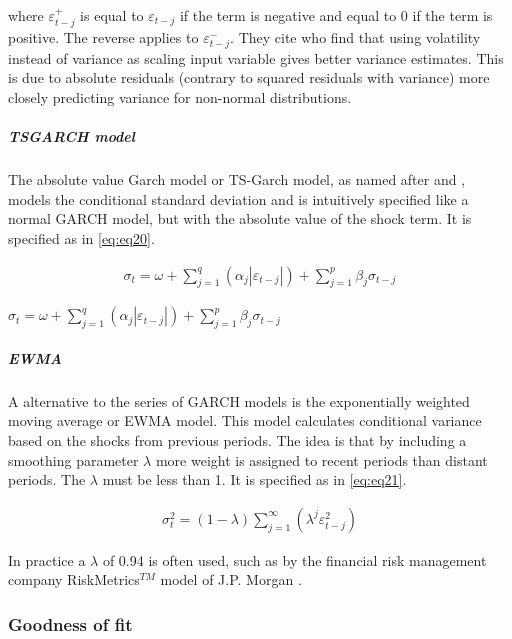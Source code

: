 \documentclass[a4paper, twoside]{templates/ociamthesis}
\begin{document}
\noindent where \(\varepsilon_{t-j}^+\) is equal to \(\varepsilon_{t-j}\) if the term is negative and equal to 0 if the term is positive. The reverse applies to \(\varepsilon_{t-j}^-\). They cite \textcite{davidian1987} who find that using volatility instead of variance as scaling input variable gives better variance estimates. This is due to absolute residuals (contrary to squared residuals with variance) more closely predicting variance for non-normal distributions.

\hypertarget{tsgarch-model}{%
\subparagraph{TSGARCH model}\label{tsgarch-model}}

\noindent The absolute value Garch model or TS-Garch model, as named after \textcite{taylor1986} and \textcite{schwert1989}, models the conditional standard deviation and is intuitively specified like a normal GARCH model, but with the absolute value of the shock term. It is specified as in \eqref{eq:eq20}.

\begin{align}
\sigma_t = \omega + \sum\limits_{j=1}^q (\alpha_j \left|\varepsilon_{t-j}\right|) +
\sum\limits_{j = 1}^p \beta_j \sigma_{t-j}
 \label{eq:eq20}
\end{align}

\newpage

\(\sigma_t = \omega + \sum\limits_{j=1}^q (\alpha_j \left|\varepsilon_{t-j}\right|) +\sum\limits_{j = 1}^p \beta_j \sigma_{t-j}\)

\hypertarget{ewma}{%
\subparagraph{EWMA}\label{ewma}}

\noindent A alternative to the series of GARCH models is the exponentially weighted moving average or EWMA model. This model calculates conditional variance based on the shocks from previous periods. The idea is that by including a smoothing parameter \(\lambda\) more weight is assigned to recent periods than distant periods. The \(\lambda\) must be less than 1. It is specified as in \eqref{eq:eq21}.

\begin{align}
\sigma_t^2 = (1-\lambda) \sum\limits_{j=1}^\infty (\lambda^j \varepsilon_{t-j}^2)
 \label{eq:eq21}
\end{align}

In practice a \(\lambda\) of 0.94 is often used, such as by the financial risk management company RiskMetrics\(^{TM}\) model of J.P. Morgan \autocite{morganguarantytrustcompany1996}.

\newpage

\hypertarget{goodness-of-fit}{%
\subsubsection{Goodness of fit}\label{goodness-of-fit}}
\end{document}
